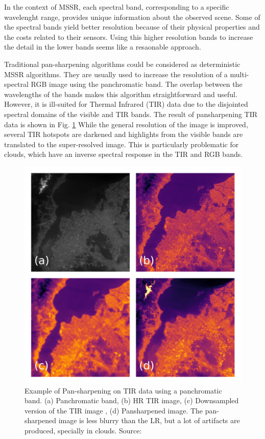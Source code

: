         In the context of MSSR, each spectral band, corresponding to a specific wavelenght range, provides unique information about the observed scene. Some of the spectral bands yield better resolution because of their physical properties and the costs related to their sensors. Using this higher resolution bands to increase the detail in the lower bands seems like a resaonable approach.

        Traditional pan-sharpening algorithms could be considered as deterministic MSSR  algorithms. They are usually used to increase the resolution of a multi-spectral RGB image using the panchromatic band. The overlap between the wavelengths of the bands makes this algorithm straightforward and useful. However, it is ill-suited for Thermal Infrared (TIR) data due to the disjointed spectral domains of the visible and TIR bands.
        The result of pansharpening TIR data is shown in Fig. \ref{fig:2-pansharpening}  While the general resolution of the image is improved, several TIR hotspots are darkened and highlights from the visible bands are translated to the super-resolved image. This is particularly problematic for clouds, which have an inverse spectral response in the TIR and RGB bands. 
        
        \begin{figure}[H]
            \centering
            \includegraphics[width=\textwidth]{Includes/2-pansharpen.png}
            \caption{Example of Pan-sharpening on TIR data using a panchromatic band. (a) Panchromatic band, (b) HR TIR image, (c) Downsampled version of the TIR image , (d) Pansharpened image. 
            The pan-sharpened image is less blurry than the LR, but a lot of artifacts are produced, specially in clouds. Source: \cite{myself2023}}
            \label{fig:2-pansharpening}
        \end{figure}

